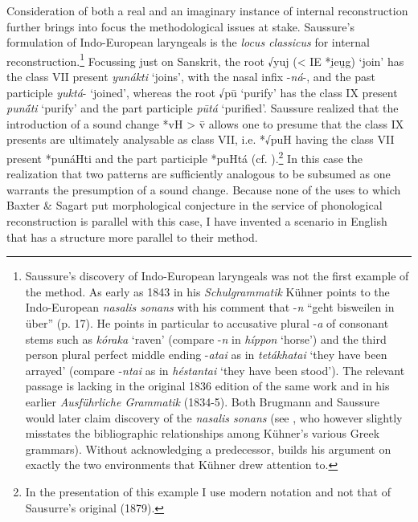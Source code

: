 Consideration of both a real and an imaginary instance of internal
reconstruction further brings into focus the methodological issues at
stake. Saussure's formulation of Indo-European laryngeals is the
 \emph{locus classicus} for internal reconstruction.\footnote{Saussure's
  discovery of Indo-European laryngeals was not the first example of the
  method. As early as 1843 in his  \emph{Schulgrammatik} Kühner points to
  the Indo-European \emph{nasalis sonans} with his comment that
  -\emph{n} ``geht bisweilen in 
  {} über'' (p. 17). He points in
  particular to accusative plural -\emph{a} of consonant stems such as {}
   \emph{kóraka} `raven' (compare -\emph{n} in 
   {} 
   \emph{híppon}
  `horse') and the third person plural perfect middle ending
  -\emph{atai} as in 
  {}  \emph{tetákhatai} `they have been
  arrayed' (compare -\emph{ntai} as in 
  {}  \emph{héstantai} `they
  have been stood'). The relevant passage is lacking in the original
  1836 edition of the same work and in his earlier \emph{Ausführliche
  Grammatik} (1834-5). Both Brugmann and Saussure would later claim
  discovery of the \emph{nasalis sonans} (see 
  \cite[133-135]{Joseph2012}, 
  who
  however slightly misstates the bibliographic relationships among
  Kühner's various Greek grammars). Without acknowledging a predecessor,
  \citet[]{Brugmann1876}
    builds his argument on exactly the two environments
  that Kühner drew attention to.} Focussing just on Sanskrit, the root
√yuj (\textless{} IE *i̯eu̯g) `join' has the class VII present
 \emph{yunákti} `joins', with the nasal infix -\emph{ná}-, and the past
participle  \emph{yuktá}- `joined', whereas the root √pū `purify' has the
class IX present \emph{punā́ti} `purify' and the part participle
 \emph{pūtá} `purified'. Saussure realized that the introduction of a
sound change *vH \textgreater{} v̄ allows one to presume that the class
IX presents are ultimately analysable as class VII, i.e. *√puH having
the class VII present *punáHti and the part participle *puHtá \emph{
}(cf. \cite[56]{Clackson2007}).\footnote{In the presentation of this example I
  use modern notation and not that of Sausurre's original (1879).} In
this case the realization that two patterns are sufficiently analogous
to be subsumed as one warrants the presumption of a sound change.
Because none of the uses to which Baxter \& Sagart put morphological
conjecture in the service of phonological reconstruction is parallel
with this case, I have invented a scenario in English that has a
structure more parallel to their method.


